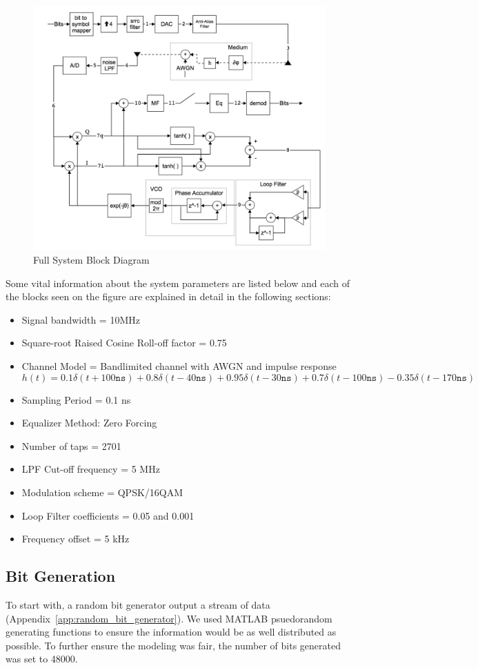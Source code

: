 \documentclass[]{article}
\begin{document}
\begin{figure}[H]
\centering
\includegraphics[width=\textwidth]{systemfinal.png}
\caption{Full System Block Diagram\label{fig:system}}
\end{figure}

Some vital information about the system parameters are listed below and each of the blocks seen on the figure are explained in detail in the following sections:
\begin{itemize}
\item Signal bandwidth = 10MHz
\item Square-root Raised Cosine Roll-off factor = 0.75
\item Channel Model = Bandlimited channel with AWGN and impulse response   $$h(t) = 0.1\delta(t + 100 \mathtt{ns}) + 0.8\delta(t -40 \mathtt{ns}) + 0.95\delta(t - 30 \mathtt{ns}) + 0.7\delta(t - 100 \mathtt{ns}) - 0.35\delta(t - 170 \mathtt{ns})  $$
\item Sampling Period = 0.1 ns
\item Equalizer Method: Zero Forcing
\item Number of taps = 2701
\item LPF Cut-off frequency = 5 MHz
\item Modulation scheme = QPSK/16QAM
\item Loop Filter coefficients =  0.05 and 0.001
\item Frequency offset = 5 kHz
\end{itemize}

\subsection{Bit Generation}
\label{sec:bits}
 To start with, a random bit generator output a stream of data (Appendix~\ref{app:random_bit_generator}). We used MATLAB psuedorandom generating functions to ensure the information would be as well distributed as possible. To further ensure the modeling was fair, the number of bits generated was set to 48000. 
\end{document}
